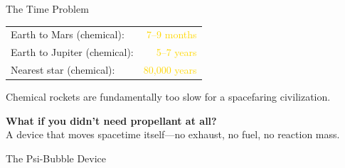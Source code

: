 \documentclass[aspectratio=169,10pt]{beamer}
\begin{document}
\begin{frame}[t]{The Time Problem}
\vspace{0.8cm}
\begin{center}
\begin{tabular}{l r}
  \textcolor{electricblue}{Earth to Mars (chemical):} & {\Large\textcolor{gold}{7--9 months}} \\[12pt]
  \textcolor{electricblue}{Earth to Jupiter (chemical):} & {\Large\textcolor{gold}{5--7 years}} \\[12pt]
  \textcolor{electricblue}{Nearest star (chemical):} & {\Large\textcolor{gold}{80,000 years}} \\
\end{tabular}
\end{center}
\vspace{0.5cm}
\begin{center}
  \small\textcolor{white!70}{Chemical rockets are fundamentally too slow for a spacefaring civilization.}
\end{center}
\end{frame}

\begin{frame}[plain]
\vfill
\begin{center}
  {\LARGE\bfseries What if you didn't need propellant at all?}\\[14pt]
  {\normalsize\textcolor{electricblue}{%
    A device that moves spacetime itself---no exhaust, no fuel, no reaction mass.}}
\end{center}
\vfill
\end{frame}

\begin{frame}[t,fragile,shrink=5]{The Psi-Bubble Device}
\vspace{0.2cm}
\begin{center}
\end{center}
\end{frame}
\end{document}
